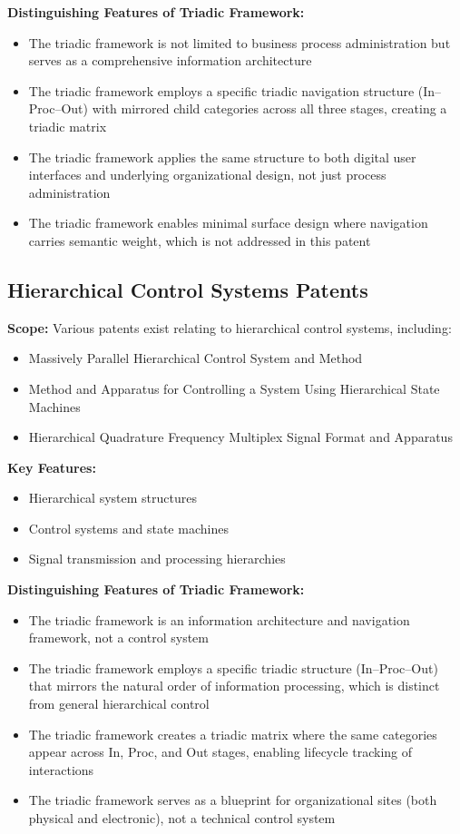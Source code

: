\documentclass[11pt,a4paper]{article}
\begin{document}
\textbf{Distinguishing Features of Triadic Framework:}
\begin{itemize}[noitemsep]
  \item The triadic framework is not limited to business process administration but serves as a comprehensive information architecture
  \item The triadic framework employs a specific triadic navigation structure (In--Proc--Out) with mirrored child categories across all three stages, creating a triadic matrix
  \item The triadic framework applies the same structure to both digital user interfaces and underlying organizational design, not just process administration
  \item The triadic framework enables minimal surface design where navigation carries semantic weight, which is not addressed in this patent
\end{itemize}

\subsection*{Hierarchical Control Systems Patents}
\textbf{Scope:} Various patents exist relating to hierarchical control systems, including:
\begin{itemize}[noitemsep]
  \item Massively Parallel Hierarchical Control System and Method
  \item Method and Apparatus for Controlling a System Using Hierarchical State Machines
  \item Hierarchical Quadrature Frequency Multiplex Signal Format and Apparatus
\end{itemize}

\textbf{Key Features:}
\begin{itemize}[noitemsep]
  \item Hierarchical system structures
  \item Control systems and state machines
  \item Signal transmission and processing hierarchies
\end{itemize}

\textbf{Distinguishing Features of Triadic Framework:}
\begin{itemize}[noitemsep]
  \item The triadic framework is an information architecture and navigation framework, not a control system
  \item The triadic framework employs a specific triadic structure (In--Proc--Out) that mirrors the natural order of information processing, which is distinct from general hierarchical control
  \item The triadic framework creates a triadic matrix where the same categories appear across In, Proc, and Out stages, enabling lifecycle tracking of interactions
  \item The triadic framework serves as a blueprint for organizational sites (both physical and electronic), not a technical control system
\end{itemize}
\end{document}
